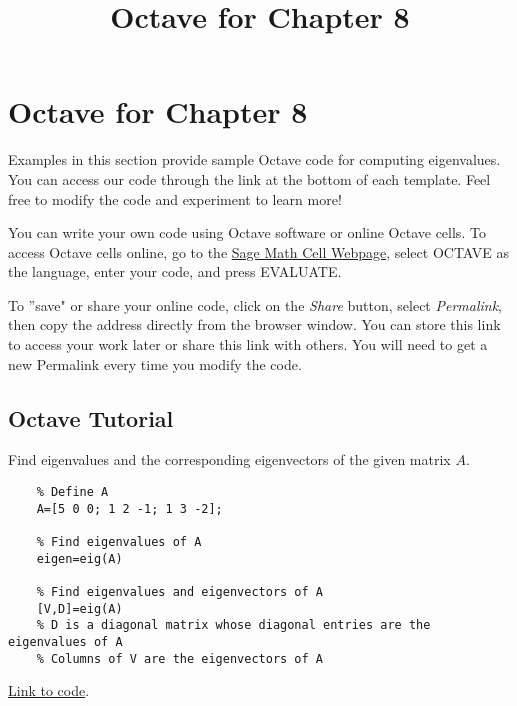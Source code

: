 \documentclass{ximera}
\title{Octave for Chapter 8} \license{CC BY-NC-SA 4.0}
\begin{document}
\begin{abstract}
\end{abstract}
\maketitle

\section*{Octave for Chapter 8}

Examples in this section provide sample Octave code for computing eigenvalues. You can access our code through the link at the bottom of each template.  Feel free to modify the code and experiment to learn more!  

You can write your own code using Octave software or online Octave cells.  To access Octave cells online, go to the \href{https://sagecell.sagemath.org/}{Sage Math Cell Webpage}, select OCTAVE as the language, enter your code, and press EVALUATE.  

To ''save" or share your online code, click on the \emph{Share} button, select \emph{Permalink}, then copy the address directly from the browser window.  You can store this link to access your work later or share this link with others.  You will need to get a new Permalink every time you modify the code.

\subsection*{Octave Tutorial}
\begin{template}\label{temp:eigen}
    Find eigenvalues and the corresponding eigenvectors of the given matrix $A$.
    
    \begin{verbatim}
    % Define A
    A=[5 0 0; 1 2 -1; 1 3 -2];
    
    % Find eigenvalues of A
    eigen=eig(A)
    
    % Find eigenvalues and eigenvectors of A
    [V,D]=eig(A)
    % D is a diagonal matrix whose diagonal entries are the eigenvalues of A
    % Columns of V are the eigenvectors of A 
    \end{verbatim}
    
    \href{https://sagecell.sagemath.org/?z=eJx1jkELgkAUhO8L_oe5LBQkqNFJPCxJP8GLeFjyqQ90F9a1-vmpkEXU5Q0zzPcYiZwaNgQVCJWVJ0SIUsRIEMaLHhEmVRqIQEhc2NQgbsncdD_RCNss2Jpk892p_Z-i3jxdvXUvsiwOebWREjl47qJm3VqjewzaO37g3tmR3imZOV2eOoLv6MciibPtp8Gsvvgqfix4AsFaTeY=&lang=octave&interacts=eJyLjgUAARUAuQ==}{Link to code}.
    \end{template}
\end{document}
